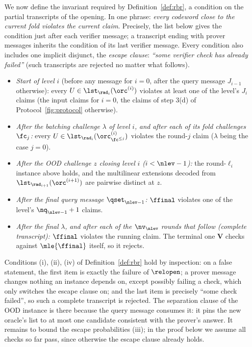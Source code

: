We now define the invariant required by Definition~\ref{def:rbr}, a condition on the partial transcripts of the opening. In one phrase: \emph{every codeword close to the current fold violates the current claim}. Precisely, the list below gives the condition just after each verifier message; a transcript ending with prover messages inherits the condition of its last verifier message. Every condition also includes one implicit disjunct, the \emph{escape clause}: \emph{``some verifier check has already failed''} (such transcripts are rejected no matter what follows).
\begin{itemize}[itemsep=1pt]
\item \emph{Start of level $i$} (before any message for $i = 0$, after the query message $J_{i-1}$ otherwise): every $U \in \lst_{\rad_i}(\orc^{(i)})$ violates at least one of the level's $J_i$ claims (the input claims for $i = 0$, the claims of step 3(d) of Protocol~\ref{fig:protocol} otherwise).
\item \emph{After the batching challenge $\lambda$ of level $i$, and after each of its fold challenges $\fc_j$:} every $U \in \lst_{\rad_i}(\orc^{(i)}_{\fc^{\le j}})$ violates the round-$j$ claim ($\lambda$ being the case $j = 0$).
\item \emph{After the OOD challenge $z$ closing level $i$ ($i < \nlev-1$):} the round-$\ell_i$ instance above holds, and the multilinear extensions decoded from $\lst_{\rad_{i+1}}(\orc^{(i+1)})$ are pairwise distinct at $z$.
\item \emph{After the final query message $\qset_{\nlev-1}$:} $\ffinal$ violates one of the level's $\nq_{\nlev-1}+1$ claims.
\item \emph{After the final $\lambda$, and after each of the $\nv_\nlev$ rounds that follow (complete transcript):} $\ffinal$ violates the running claim. The terminal one $\mathbf{V}$ checks against $\mle{\ffinal}$ itself, so it rejects.
\end{itemize}
Conditions (i), (ii), (iv) of Definition~\ref{def:rbr} hold by inspection: on a false statement, the first item is exactly the failure of $\relopen$; a prover message changes nothing an instance depends on, except possibly failing a check, which only switches the escape clause on; and the last item is precisely ``some check failed'', so such a complete transcript is rejected. The separation clause of the OOD instance is there because the query message consumes it: it pins the new oracle's list to at most one candidate consistent with the prover's answer. It remains to bound the escape probabilities (iii); in the proof below we assume all checks so far pass, since otherwise the escape clause already holds.

